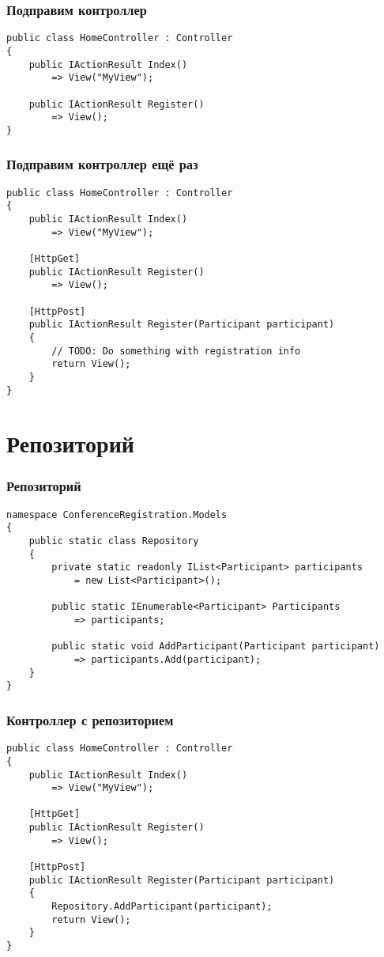 \documentclass[xetex,mathserif,serif]{beamer}
\begin{document}
    \begin{frame}[fragile]
        \frametitle{Подправим контроллер}
        \begin{verbatim}
public class HomeController : Controller
{
    public IActionResult Index()
        => View("MyView");

    public IActionResult Register()
        => View();
}
        \end{verbatim}
    \end{frame}

    \begin{frame}[fragile]
        \frametitle{Подправим контроллер ещё раз}
        \begin{footnotesize}
            \begin{verbatim}
public class HomeController : Controller
{
    public IActionResult Index()
        => View("MyView");

    [HttpGet]
    public IActionResult Register() 
        => View();

    [HttpPost]
    public IActionResult Register(Participant participant)
    {
        // TODO: Do something with registration info
        return View();
    }
}
            \end{verbatim}
        \end{footnotesize}
    \end{frame}

    \section{Репозиторий}

    \begin{frame}[fragile]
        \frametitle{Репозиторий}
        \begin{verbatim}
namespace ConferenceRegistration.Models
{
    public static class Repository
    {
        private static readonly IList<Participant> participants 
            = new List<Participant>();

        public static IEnumerable<Participant> Participants 
            => participants;

        public static void AddParticipant(Participant participant) 
            => participants.Add(participant);
    }
}
        \end{verbatim}
    \end{frame}

    \begin{frame}[fragile]
        \frametitle{Контроллер с репозиторием}
        \begin{verbatim}
public class HomeController : Controller
{
    public IActionResult Index()
        => View("MyView");

    [HttpGet]
    public IActionResult Register()
        => View();

    [HttpPost]
    public IActionResult Register(Participant participant)
    {
        Repository.AddParticipant(participant);
        return View();
    }
}
        \end{verbatim}
    \end{frame}
\end{document}
